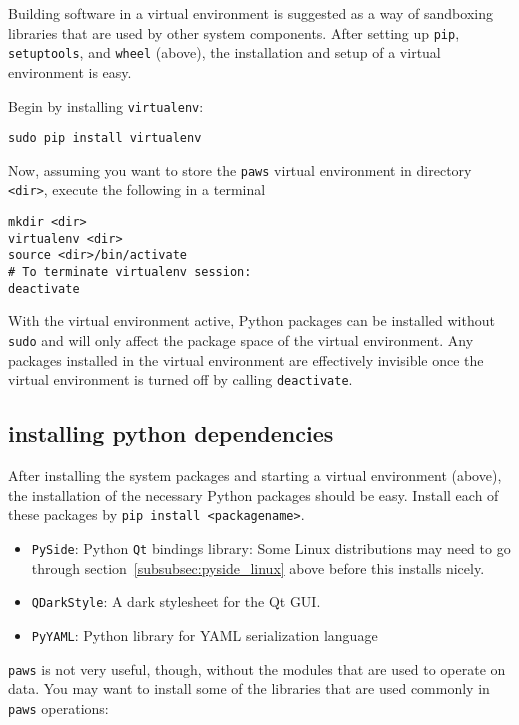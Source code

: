 Building software in a virtual environment is suggested 
as a way of sandboxing libraries that are used by other system components.
After setting up \verb|pip|, \verb|setuptools|, and \verb|wheel| (above),
the installation and setup of a virtual environment is easy.

Begin by installing \verb|virtualenv|:
\begin{lstlisting}
sudo pip install virtualenv
\end{lstlisting}

Now, assuming you want to store the \verb|paws| virtual environment
in directory \verb|<dir>|,
execute the following in a terminal
\begin{lstlisting}
mkdir <dir> 
virtualenv <dir>
source <dir>/bin/activate
# To terminate virtualenv session:
deactivate
\end{lstlisting}

With the virtual environment active,
Python packages can be installed without \verb|sudo|
and will only affect the package space of the virtual environment.
Any packages installed in the virtual environment are effectively invisible
once the virtual environment is turned off by calling \verb|deactivate|.


\subsection{installing python dependencies}
\label{subsec:dependencies}

After installing the system packages and starting a virtual environment (above),
the installation of the necessary Python packages should be easy.
Install each of these packages by \verb|pip install <packagename>|.

\begin{itemize}
\item \verb|PySide|: Python \verb|Qt| bindings library: 
    Some Linux distributions may need to go through section~\ref{subsubsec:pyside_linux} above
    before this installs nicely.
\item \verb|QDarkStyle|: A dark stylesheet for the Qt GUI.
\item \verb|PyYAML|: Python library for YAML serialization language 
\end{itemize}

\verb|paws| is not very useful, though, without the modules that are used to operate on data.
You may want to install some of the libraries that are used commonly in \verb|paws| operations:

